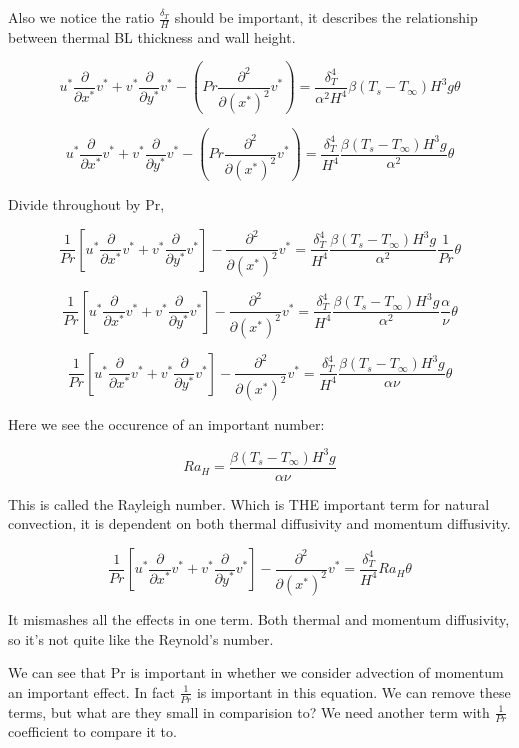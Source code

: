 \documentclass[11pt]{article}
\begin{document}
Also we notice the ratio $\frac{\delta_T}{H}$ should be important, it describes the relationship between thermal BL thickness and wall height.

$$   u^* \frac{\partial}{\partial x^*} v^* +    v^* \frac{\partial}{\partial y^*} v^*  -  ( Pr \frac{\partial^2}{\partial (x^*)^2} v^* ) = \frac{\delta_T^4}{\alpha^2 H^4} \beta(T_s-T_\infty) H^3 g \theta $$



$$   u^* \frac{\partial}{\partial x^*} v^* +    v^* \frac{\partial}{\partial y^*} v^*  -  ( Pr \frac{\partial^2}{\partial (x^*)^2} v^* ) = \frac{\delta_T^4}{ H^4} \frac{\beta(T_s-T_\infty) H^3 g}{\alpha^2}  \theta $$

Divide throughout by Pr,

$$ \frac{1}{Pr} \left[ u^* \frac{\partial}{\partial x^*} v^* +    v^* \frac{\partial}{\partial y^*} v^* \right] -   \frac{\partial^2}{\partial (x^*)^2} v^*  = \frac{\delta_T^4}{ H^4} \frac{\beta(T_s-T_\infty) H^3 g}{\alpha^2} \frac{1}{Pr} \theta $$

$$ \frac{1}{Pr} \left[ u^* \frac{\partial}{\partial x^*} v^* +    v^* \frac{\partial}{\partial y^*} v^* \right] -   \frac{\partial^2}{\partial (x^*)^2} v^*  = \frac{\delta_T^4}{ H^4} \frac{\beta(T_s-T_\infty) H^3 g}{\alpha^2} \frac{\alpha	}{\nu} \theta $$

$$ \frac{1}{Pr} \left[ u^* \frac{\partial}{\partial x^*} v^* +    v^* \frac{\partial}{\partial y^*} v^* \right] -   \frac{\partial^2}{\partial (x^*)^2} v^*  = \frac{\delta_T^4}{ H^4} \frac{\beta(T_s-T_\infty) H^3 g}{\alpha \nu}  \theta $$


Here we see the occurence of an important number:

$$Ra_H =  \frac{\beta(T_s-T_\infty) H^3 g}{\alpha \nu}$$



This is called the Rayleigh number. Which is THE important term for natural convection, it is dependent on both thermal diffusivity and momentum diffusivity. 

$$ \frac{1}{Pr} \left[ u^* \frac{\partial}{\partial x^*} v^* +    v^* \frac{\partial}{\partial y^*} v^* \right] -   \frac{\partial^2}{\partial (x^*)^2} v^*  = \frac{\delta_T^4}{ H^4} Ra_H  \theta $$


It mismashes all the effects in one term. Both thermal and momentum diffusivity, so it's not quite like the Reynold's number.

We can see that Pr is important in whether we consider advection of momentum an important effect. In fact $\frac{1}{Pr}$ is important in this equation. We can remove these terms, but what are they small in comparision to? We need another term with $\frac{1}{Pr}$ coefficient to compare it to.
\end{document}
